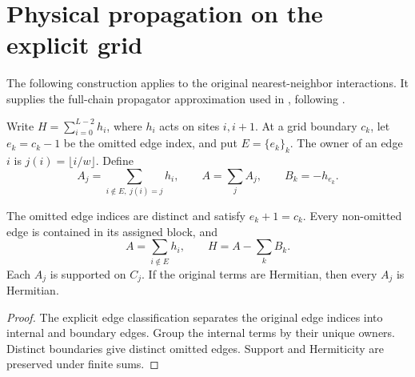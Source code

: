 \section{Physical propagation on the explicit grid}
\label{sec:huang_physical_propagation}

The following construction applies to the original nearest-neighbor interactions.
It supplies the full-chain propagator approximation used in
\cite[Section 5.4, Lemma 19]{Huang2015GroundState}, following
\cite[Figure 2 and equations (2)--(13)]{Osborne2006Dynamics}.

\begin{definition}
    \label{def:huang_grid_hamiltonian}
    \leanok
    Write $H=\sum_{i=0}^{L-2}h_i$, where $h_i$ acts on sites $i,i+1$.
    At a grid boundary $c_k$, let $e_k=c_k-1$ be the omitted edge index,
    and put $E=\{e_k\}_k$. The owner of an edge $i$ is $j(i)=\lfloor i/w\rfloor$.
    Define
    \[
        A_j=\sum_{i\notin E,\ j(i)=j}h_i,\qquad
        A=\sum_jA_j,\qquad B_k=-h_{e_k}.
    \]
\end{definition}

\begin{lemma}
    \label{thm:huang_grid_hamiltonian_decomposition}
    \leanok
    The omitted edge indices are distinct and satisfy $e_k+1=c_k$.
    Every non-omitted edge is contained in its assigned block, and
    \[
        A=\sum_{i\notin E}h_i,\qquad H=A-\sum_kB_k.
    \]
    Each $A_j$ is supported on $C_j$. If the original terms are Hermitian,
    then every $A_j$ is Hermitian.
\end{lemma}
\begin{proof}
    \leanok
    The explicit edge classification separates the original edge indices into
    internal and boundary edges. Group the internal terms by their unique owners.
    Distinct boundaries give distinct omitted edges. Support and Hermiticity are
    preserved under finite sums.
\end{proof}

